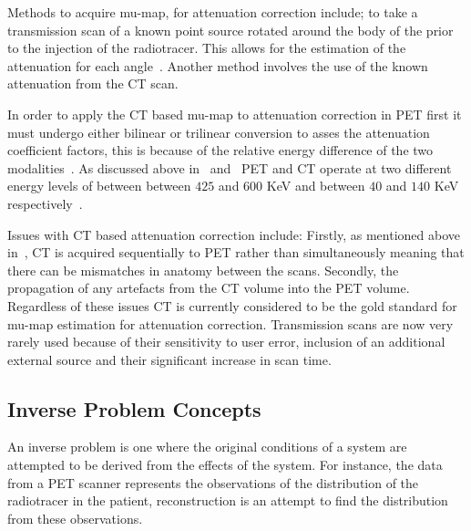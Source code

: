                 Methods to acquire \gls{mu-map}, for attenuation correction include; to take a transmission scan of a known point source rotated around the body of the  prior to the injection of the radiotracer. This allows for the estimation of the attenuation for each angle~. Another method involves the use of the known attenuation from the \gls{CT} scan.
                
                In order to apply the \gls{CT} based \gls{mu-map} to attenuation correction in \gls{PET} first it must undergo either bilinear or trilinear conversion to asses the attenuation coefficient factors, this is because of the relative energy difference of the two modalities~. As discussed above in~ and~ \gls{PET} and \gls{CT} operate at two different energy levels of between between $425$ and $600$ \gls{KeV} and between $40$ and $140$ \gls{KeV} respectively~.
                
                Issues with \gls{CT} based attenuation correction include: Firstly, as mentioned above in~, \gls{CT} is acquired sequentially to \gls{PET} rather than simultaneously meaning that there can be mismatches in anatomy between the scans. Secondly, the propagation of any artefacts from the \gls{CT} volume into the \gls{PET} volume. Regardless of these issues \gls{CT} is currently considered to be the gold standard for \gls{mu-map} estimation for attenuation correction. Transmission scans are now very rarely used because of their sensitivity to user error, inclusion of an additional external source and their significant increase in scan time.
    
        
        
        \subsection{Inverse Problem Concepts} \label{sec:inverse_problem_concepts}
            An inverse problem is one where the original conditions of a system are attempted to be derived from the effects of the system. For instance, the data from a \gls{PET} scanner represents the observations of the distribution of the radiotracer in the patient, reconstruction is an attempt to find the distribution from these observations.
            
